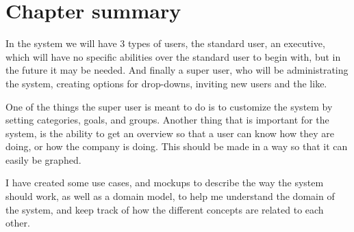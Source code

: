 \section{Chapter summary}
In the system we will have 3 types of users, the standard user, an executive,
which will have no specific abilities over the standard user to begin with, but
in the future it may be needed. And finally a super user, who will be
administrating the system, creating options for drop-downs, inviting new users
and the like.

One of the things the super user is meant to do is to customize the system by
setting categories, goals, and groups. Another thing that is important for the
system, is the ability to get an overview so that a user can know how they are
doing, or how the company is doing. This should be made in a way so that it can
easily be graphed.

I have created some use cases, and mockups to describe the way the system should
work, as well as a domain model, to help me understand the domain of the system,
and keep track of how the different concepts are related to each other.
